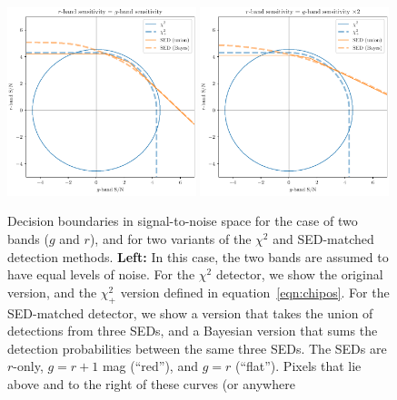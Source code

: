 \documentclass[11pt,letterpaper,linenumbers]{aastex63}
\newcommand{\equationname}{equation}
\newcommand{\eqnref}[1]{\mbox{\equationname~\ref{#1}}}
\newcommand{\chipos}{\chi_+}
\begin{document}
\begin{figure}
  \begin{center}
    \includegraphics[width=0.49\textwidth]{chisq-pos-decision-boundary}%
    \hspace{0.01\textwidth}%
    \includegraphics[width=0.49\textwidth]{chisq-pos-decision-boundary-sens}%
  \end{center}
  \caption{Decision boundaries in signal-to-noise space for the case
    of two bands ($g$ and $r$), and for two variants of the $\chi^2$
    and SED-matched detection methods.  \textbf{Left:} In this case,
    the two bands are assumed to have equal levels of noise.  For the
    $\chi^2$ detector, we show the original version, and the
    $\chipos^2$ version defined in \eqnref{eqn:chipos}.  For the
    SED-matched detector, we show a version that takes the union of
    detections from three SEDs, and a Bayesian version that sums the
    detection probabilities between the same three SEDs.  The SEDs are
    $r$-only, $g = r + 1$ mag (``red''), and $g=r$ (``flat'').  Pixels
    that lie above and to the right of these curves (or anywhere
}
\end{figure}
\end{document}
